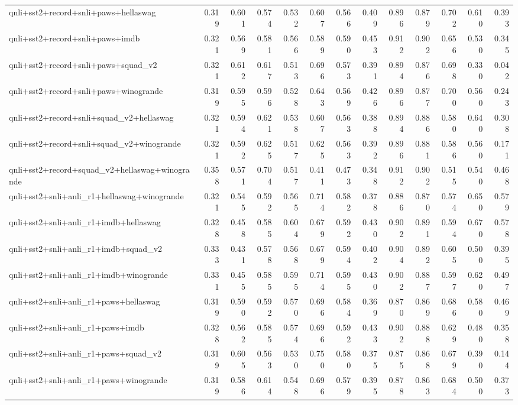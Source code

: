 \begin{table}[t]
\begin{tabular}{lrrrrrrrrrrrr}
    qnli+sst2+record+snli+paws+hellaswag & 0.319 & 0.601 & 0.574 & 0.532 & 0.607 & 0.566 & 0.409 & 0.896 & 0.879 & 0.702 & 0.610 & 0.393 \\
    qnli+sst2+record+snli+paws+imdb & 0.321 & 0.569 & 0.581 & 0.566 & 0.589 & 0.590 & 0.453 & 0.912 & 0.902 & 0.656 & 0.530 & 0.345 \\
    qnli+sst2+record+snli+paws+squad\_v2 & 0.321 & 0.612 & 0.617 & 0.513 & 0.696 & 0.573 & 0.391 & 0.894 & 0.876 & 0.698 & 0.330 & 0.042 \\
    qnli+sst2+record+snli+paws+winogrande & 0.319 & 0.595 & 0.596 & 0.528 & 0.643 & 0.569 & 0.426 & 0.896 & 0.877 & 0.700 & 0.560 & 0.243 \\
    qnli+sst2+record+snli+squad\_v2+hellaswag & 0.321 & 0.594 & 0.621 & 0.538 & 0.607 & 0.563 & 0.388 & 0.894 & 0.886 & 0.580 & 0.640 & 0.308 \\
    qnli+sst2+record+snli+squad\_v2+winogrande & 0.321 & 0.592 & 0.625 & 0.517 & 0.625 & 0.563 & 0.392 & 0.896 & 0.881 & 0.586 & 0.560 & 0.171 \\
    qnli+sst2+record+squad\_v2+hellaswag+winogrande & 0.358 & 0.571 & 0.704 & 0.517 & 0.411 & 0.473 & 0.348 & 0.912 & 0.902 & 0.515 & 0.540 & 0.468 \\
    qnli+sst2+snli+anli\_r1+hellaswag+winogrande & 0.321 & 0.545 & 0.592 & 0.565 & 0.714 & 0.582 & 0.378 & 0.886 & 0.870 & 0.574 & 0.650 & 0.579 \\
    qnli+sst2+snli+anli\_r1+imdb+hellaswag & 0.328 & 0.458 & 0.585 & 0.604 & 0.679 & 0.592 & 0.430 & 0.902 & 0.891 & 0.594 & 0.670 & 0.578 \\
    qnli+sst2+snli+anli\_r1+imdb+squad\_v2 & 0.333 & 0.431 & 0.578 & 0.568 & 0.679 & 0.594 & 0.402 & 0.904 & 0.892 & 0.605 & 0.500 & 0.395 \\
    qnli+sst2+snli+anli\_r1+imdb+winogrande & 0.331 & 0.455 & 0.585 & 0.595 & 0.714 & 0.595 & 0.430 & 0.902 & 0.887 & 0.597 & 0.620 & 0.497 \\
    qnli+sst2+snli+anli\_r1+paws+hellaswag & 0.319 & 0.590 & 0.592 & 0.570 & 0.696 & 0.584 & 0.369 & 0.870 & 0.869 & 0.686 & 0.580 & 0.469 \\
    qnli+sst2+snli+anli\_r1+paws+imdb & 0.328 & 0.562 & 0.585 & 0.574 & 0.696 & 0.592 & 0.433 & 0.902 & 0.888 & 0.629 & 0.480 & 0.358 \\
    qnli+sst2+snli+anli\_r1+paws+squad\_v2 & 0.319 & 0.605 & 0.563 & 0.530 & 0.750 & 0.580 & 0.375 & 0.875 & 0.868 & 0.679 & 0.390 & 0.144 \\
    qnli+sst2+snli+anli\_r1+paws+winogrande & 0.319 & 0.586 & 0.614 & 0.548 & 0.696 & 0.579 & 0.395 & 0.878 & 0.863 & 0.684 & 0.500 & 0.373 \\

\end{tabular}
\end{table}
